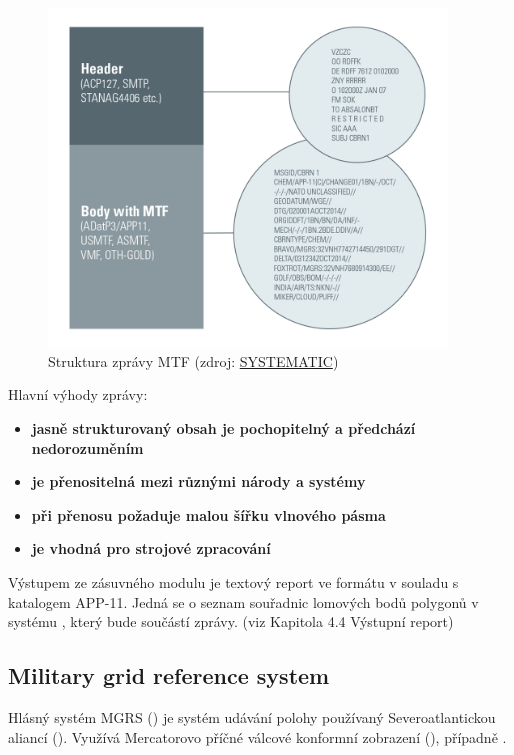 \begin{figure}[H]
    \centering
      \includegraphics[width=300pt]{./pictures/Military-Messaging-white-borders-988px.png}
      \caption[Struktura zprávy MTF]{Struktura zprávy MTF
      (zdroj: \href{https://systematic.com/defence/products/a/military-messaging/app-11-and-adatp-3/}{SYSTEMATIC})}
      \label{fig:systematic}
  \end{figure}
  
Hlavní výhody  zprávy:

\begin{itemize}
	\item \textbf{jasně strukturovaný obsah je pochopitelný a předchází nedorozuměním} 
	\item \textbf{je přenositelná mezi různými národy a systémy} 
	\item \textbf{při přenosu požaduje malou šířku vlnového pásma}
	\item \textbf{je vhodná pro strojové zpracování}
\end{itemize}

Výstupem ze zásuvného modulu je textový report ve formátu v souladu s
katalogem APP-11. Jedná se o seznam souřadnic lomových bodů polygonů v
systému , který bude součástí  zprávy. (viz Kapitola
4.4 Výstupní report)

\subsection{Military grid reference system}
Hlásný systém MGRS () je systém udávání polohy používaný
Severoatlantickou aliancí (). Využívá Mercatorovo příčné
válcové konformní zobrazení (), případně .

